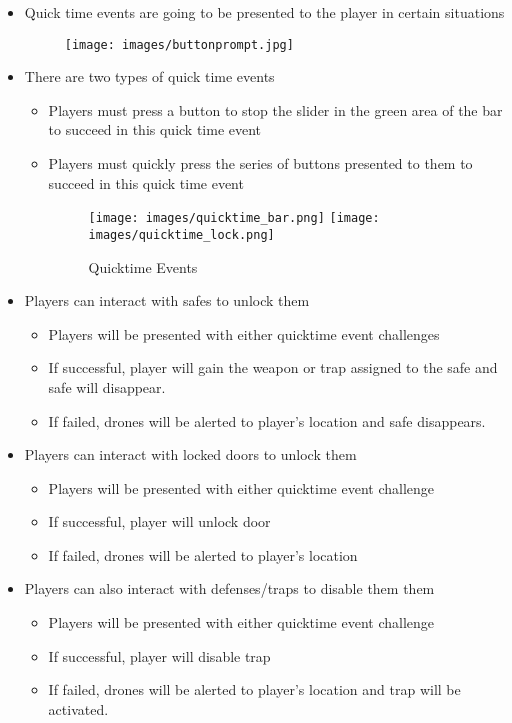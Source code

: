 \documentclass[10pt]{report}
\begin{document}
\begin{itemize}
    \item Quick time events are going to be presented to the player in certain situations
    \begin{figure}[H]
        \centering
        \texttt{[image: images/buttonprompt.jpg]}
    \end{figure}
    \item There are two types of quick time events
    \begin{itemize}
        \item Players must press a button to stop the slider in the green area of the bar to  succeed in this quick time event 
        \item Players must quickly press the series of buttons presented to them to succeed in this quick time event
        \begin{figure}[H]
            \centering
            \texttt{[image: images/quicktime\_bar.png]}
            \texttt{[image: images/quicktime\_lock.png]}
            \caption{Quicktime Events}
        \end{figure}
    \end{itemize}
    \item Players can interact with safes to unlock them
    \begin{itemize}
        \item Players will be presented with either quicktime event challenges
        \item If successful, player will gain the weapon or trap assigned to the safe and safe will disappear.
        \item If failed, drones will be alerted to player’s location and safe disappears.
    \end{itemize}
    \item Players can interact with locked doors to unlock them
    \begin{itemize}
        \item Players will be presented with either quicktime event challenge
        \item If successful, player will unlock door 
        \item If failed, drones will be alerted to player’s location
    \end{itemize}
    \item Players can also interact with defenses/traps to disable them them
    \begin{itemize}
        \item Players will be presented with either quicktime event challenge
        \item If successful, player will disable trap 
        \item If failed, drones will be alerted to player’s location and trap will be activated.
    \end{itemize}
\end{itemize}
\end{document}
